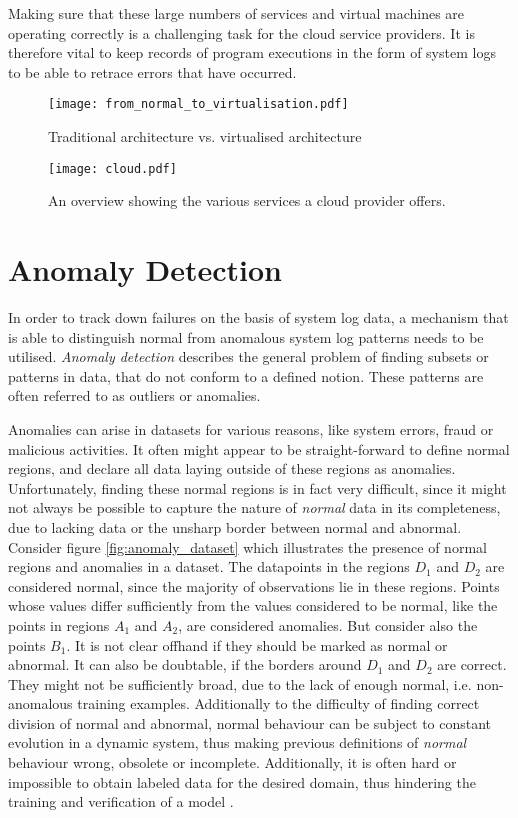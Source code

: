 Making sure that these large numbers of services and virtual machines are operating correctly is a challenging task for the cloud service providers. It is therefore vital to keep records of program executions in the form of system logs to be able to retrace errors that have occurred.

\begin{figure}[h]
  \centering
  \texttt{[image: from\_normal\_to\_virtualisation.pdf]}\\
  \caption{Traditional architecture vs. virtualised architecture}
  \label{fig:virtualisation}
\end{figure}

\begin{figure}[H]
  \centering
  \texttt{[image: cloud.pdf]}\\
  \caption{An overview showing the various services a  cloud provider offers.}
  \label{fig:cloud}
\end{figure}


\section{Anomaly Detection \label{sec:anomaly-detection}}
In order to track down failures on the basis of system log data, a mechanism that is able to distinguish normal from anomalous system log patterns needs to be utilised.
\textit{Anomaly detection} describes the general problem of finding subsets or patterns in data, that do not conform to a defined notion. These patterns are often referred to as outliers or anomalies.

Anomalies can arise in datasets for various reasons, like system errors, fraud or malicious activities. It often might appear to be straight-forward to define normal regions, and declare all data laying outside of these regions as anomalies. Unfortunately, finding these normal regions is in fact very difficult, since it might not always be possible to capture the nature of \textit{normal} data in its completeness, due to lacking data or the unsharp border between normal and abnormal. Consider figure \ref{fig:anomaly_dataset} which illustrates the presence of normal regions and anomalies in a dataset. The datapoints in the regions $D_1$ and $D_2$ are considered normal, since the majority of observations lie in these regions. Points whose values differ sufficiently from the values considered to be normal, like the points in regions $A_1$ and $A_2$, are considered anomalies. But consider also the points $B_1$. It is not clear offhand if they should be marked as normal or abnormal. It can also be doubtable, if the borders around $D_1$ and $D_2$ are correct. They might not be sufficiently broad, due to the lack of enough normal, i.e. non-anomalous training examples. 
Additionally to the difficulty of finding correct division of normal and abnormal, normal behaviour can be subject to constant evolution in a dynamic system, thus making previous definitions of \textit{normal} behaviour wrong, obsolete or incomplete. Additionally, it is often hard or impossible to obtain labeled data for the desired domain, thus hindering the training and verification of a model \cite{chandola2009anomaly}.

